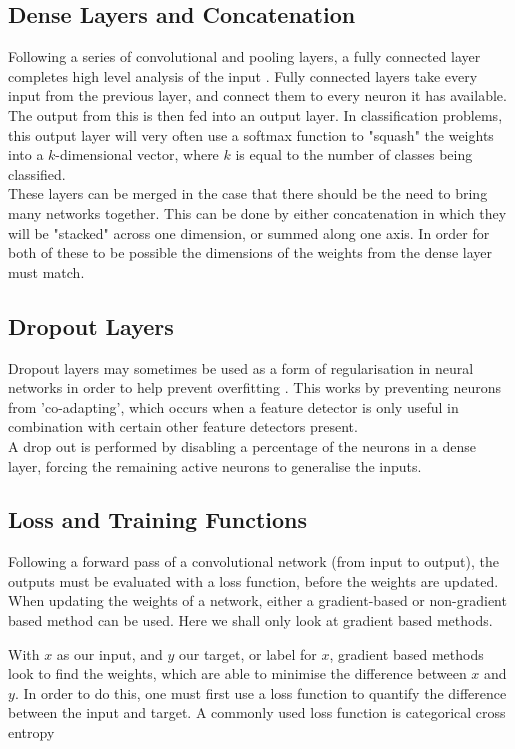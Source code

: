 \documentclass[11pt,a4paper]{memoir}
\numberwithin{figure}{section}
\numberwithin{table}{section}
\numberwithin{equation}{section}
\begin{document}
\subsection{Dense Layers and Concatenation}
Following a series of convolutional and pooling layers, a fully connected layer completes high level analysis of the input \cite{Goodfellow-et-al-2016-Book}. Fully connected layers take every input from the previous layer, and connect them to every neuron it has available. The output from this is then fed into an output layer. In classification problems, this output layer will very often use a softmax function to "squash" the weights into a $k$-dimensional vector, where $k$ is equal to the number of classes being classified. \\

These layers can be merged in the case that there should be the need to bring many networks together. This can be done by either concatenation in which they will be "stacked" across one dimension, or summed along one axis. In order for both of these to be possible the dimensions of the weights from the dense layer must match. 

\subsection{Dropout Layers}
Dropout layers may sometimes be used as a form of regularisation in neural networks in order to help prevent overfitting \cite{Hinton2012ImprovingDetectors}. This works by preventing neurons from 'co-adapting', which occurs when a feature detector is only useful in combination with certain other feature detectors present.\\

A drop out is performed by disabling a percentage of the neurons in a dense layer, forcing the remaining active neurons to generalise the inputs.

\subsection{Loss and Training Functions} 
Following a forward pass of a convolutional network (from input to output), the outputs must be evaluated with a loss function, before the weights are updated. When updating the weights of a network, either a gradient-based or non-gradient based method can be used. Here we shall only look at gradient based methods.  

With $x$  as our input, and $y$ our target, or label for $x$, gradient based methods look to find the weights, which are able to minimise the difference between $x$ and $y$. In order to do this, one must first use a loss function to quantify the difference between the input and target. A commonly used loss function is \cite{DeBoer2005AMethod} categorical cross entropy \\
\end{document}
